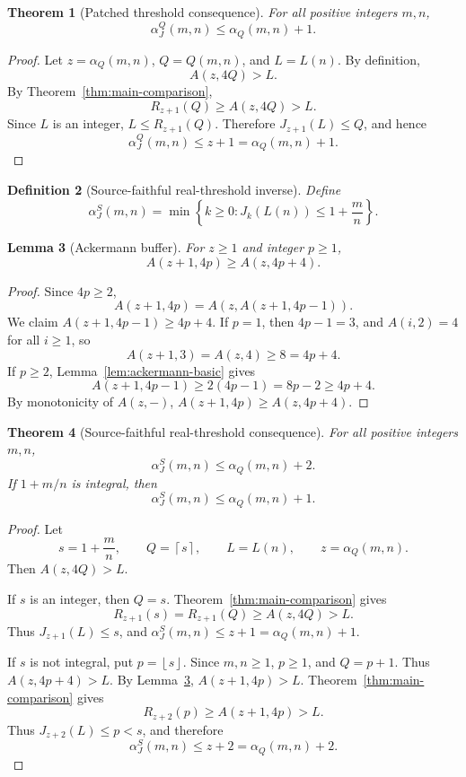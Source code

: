 ﻿\documentclass[11pt]{article}
\newtheorem{theorem}{Theorem}[section]
\newtheorem{lemma}[theorem]{Lemma}
\newtheorem{definition}[theorem]{Definition}
\newcommand{\ceil}[1]{\left\lceil #1 \right\rceil}
\newcommand{\floor}[1]{\left\lfloor #1 \right\rfloor}
\newcommand{\alphaQ}{\alpha_Q}
\newcommand{\alphaJQ}{\alpha_J^Q}
\newcommand{\alphaJS}{\alpha_J^S}
\begin{document}
\begin{theorem}[Patched threshold consequence]\label{thm:patched-alpha}
For all positive integers $m,n$,
\[
\alphaJQ(m,n)\le\alphaQ(m,n)+1.
\]
\end{theorem}

\begin{proof}
Let $z=\alphaQ(m,n)$, $Q=Q(m,n)$, and $L=L(n)$.  By definition,
\[
A(z,4Q)>L.
\]
By Theorem~\ref{thm:main-comparison},
\[
R_{z+1}(Q)\ge A(z,4Q)>L.
\]
Since $L$ is an integer, $L\le R_{z+1}(Q)$.  Therefore $J_{z+1}(L)\le Q$, and hence
\[
\alphaJQ(m,n)\le z+1=\alphaQ(m,n)+1.
\]
\end{proof}

\begin{definition}[Source-faithful real-threshold inverse]
Define
\[
\alphaJS(m,n)=\min\left\{k\ge0:J_k(L(n))\le1+\frac mn\right\}.
\]
\end{definition}

\begin{lemma}[Ackermann buffer]\label{lem:ackermann-buffer}
For $z\ge1$ and integer $p\ge1$,
\[
A(z+1,4p)\ge A(z,4p+4).
\]
\end{lemma}

\begin{proof}
Since $4p\ge2$,
\[
A(z+1,4p)=A(z,A(z+1,4p-1)).
\]
We claim $A(z+1,4p-1)\ge4p+4$.  If $p=1$, then $4p-1=3$, and $A(i,2)=4$ for all $i\ge1$, so
\[
A(z+1,3)=A(z,4)\ge8=4p+4.
\]
If $p\ge2$, Lemma~\ref{lem:ackermann-basic} gives
\[
A(z+1,4p-1)\ge2(4p-1)=8p-2\ge4p+4.
\]
By monotonicity of $A(z,-)$, $A(z+1,4p)\ge A(z,4p+4)$.
\end{proof}

\begin{theorem}[Source-faithful real-threshold consequence]\label{thm:source-alpha}
For all positive integers $m,n$,
\[
\alphaJS(m,n)\le\alphaQ(m,n)+2.
\]
If $1+m/n$ is integral, then
\[
\alphaJS(m,n)\le\alphaQ(m,n)+1.
\]
\end{theorem}

\begin{proof}
Let
\[
s=1+\frac mn,
\qquad
Q=\ceil{s},
\qquad
L=L(n),
\qquad
z=\alphaQ(m,n).
\]
Then $A(z,4Q)>L$.

If $s$ is an integer, then $Q=s$.  Theorem~\ref{thm:main-comparison} gives
\[
R_{z+1}(s)=R_{z+1}(Q)\ge A(z,4Q)>L.
\]
Thus $J_{z+1}(L)\le s$, and $\alphaJS(m,n)\le z+1=\alphaQ(m,n)+1$.

If $s$ is not integral, put $p=\floor{s}$.  Since $m,n\ge1$, $p\ge1$, and $Q=p+1$.  Thus $A(z,4p+4)>L$.  By Lemma~\ref{lem:ackermann-buffer}, $A(z+1,4p)>L$.  Theorem~\ref{thm:main-comparison} gives
\[
R_{z+2}(p)\ge A(z+1,4p)>L.
\]
Thus $J_{z+2}(L)\le p<s$, and therefore
\[
\alphaJS(m,n)\le z+2=\alphaQ(m,n)+2.
\]
\end{proof}
\end{document}
